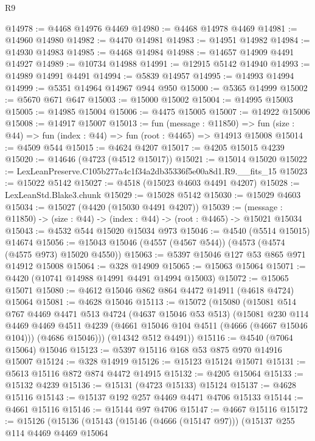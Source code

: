 \begin{lexlean}{R9}
\begin{coremodule}
@14978 := @4468 @14976 @4469
@14980 := @4468 @14978 @4469
@14981 := @14960 @14980
@14982 := @4470 @14981
@14983 := @14951 @14982
@14984 := @14930 @14983
@14985 := @4468 @14984
@14988 := @14657 @14909 @4491 @14927
@14989 := @10734 @14988
@14991 := @12915 @5142 @14940
@14993 := @14989 @14991 @4491
@14994 := @5839 @14957
@14995 := @14993 @14994
@14999 := @5351 @14964 @14967 @944 @950
@15000 := @5365 @14999
@15002 := @5670 @671 @647
@15003 := @15000 @15002
@15004 := @14995 @15003
@15005 := @14985 @15004
@15006 := @4475 @15005
@15007 := @14922 @15006
@15008 := @14917 @15007
@15013 := fun (message : @11850) =>
  fun (size : @44) => fun (index : @44) => fun (root : @4465) => @14913 @15008
@15014 := @4509 @544
@15015 := @4624 @4207
@15017 := @4205 @15015 @4239
@15020 := @14646 (@4723 (@4512 @15017))
@15021 := @15014 @15020
@15022 := LexLeanPreserve.C105b277a4c1f34a2db35336f5e00a8d1.R9.__fits_15
@15023 := @15022 @5142
@15027 := @4518 (@15023 @4603 @4491 @4207)
@15028 := LexLeanStd.Blake3.chunk
@15029 := @15028 @5142
@15030 := @15029 @4603
@15034 := @15027 (@4420 (@15030 @4491 @4207))
@15039 := (message : @11850) -> (size : @44) -> (index : @44) -> (root : @4465) -> @15021 @15034
@15043 := @4532 @544 @15020 @15034 @973
@15046 := @4540 (@5514 @15015) @14674
@15056 := @15043 @15046 (@4557 (@4567 @544)) (@4573 (@4574 (@4575 @973) @15020 @4550))
@15063 := @5397 @15046 @127 @53 @865 @971 @14912 @15008
@15064 := @328 @14909
@15065 := @15063 @15064
@15071 := @4420 (@10741 @14988 @14991 @4491 @14994 @15003)
@15072 := @15065 @15071
@15080 := @4612 @15046 @862 @864 @4472 @14911 (@4618 @4724) @15064
@15081 := @4628 @15046
@15113 := @15072
    (@15080
      (@15081
        @514
        @767
        @4469
        @4471
        @513
        @4724
        (@4637 @15046 @53 @513)
        (@15081
          @230
          @114
          @4469
          @4469
          @4511
          @4239
          (@4661 @15046 @104 @4511 (@4666 (@4667 @15046 @104)))
          (@4686 @15046)))
      (@14342 @512 @4491))
@15116 := @4540 (@7064 @15064) @15046
@15123 := @5397 @15116 @168 @53 @875 @970 @14916 @15007
@15124 := @328 @14919
@15126 := @15123 @15124 @15071
@15131 := @5613 @15116 @872 @874 @4472 @14915
@15132 := @4205 @15064
@15133 := @15132 @4239
@15136 := @15131 (@4723 @15133) @15124
@15137 := @4628 @15116
@15143 := @15137 @192 @257 @4469 @4471 @4706 @15133
@15144 := @4661 @15116
@15146 := @15144 @97 @4706
@15147 := @4667 @15116
@15172 := @15126
    (@15136
      (@15143
        (@15146 (@4666 (@15147 @97)))
        (@15137
          @255
          @114
          @4469
          @4469
          @15064

\end{coremodule}
\end{lexlean}
